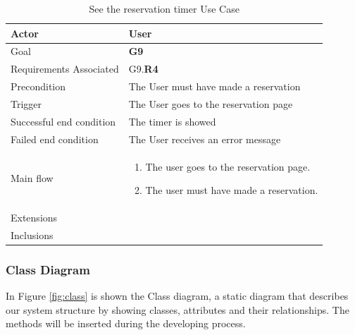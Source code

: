\newline
\begin{table}[htb]
\begin{center}
\renewcommand{\arraystretch}{1.5}
\begin{tabular}{|l|p{}|}
\hline
Actor & User \\ \hline
Goal & \textbf{G9} \\ \hline
Requirements Associated & G9.\textbf{R4} \\ \hline
Precondition & The User must have made a reservation \\ \hline
Trigger & The User goes to the reservation page \\ \hline
Successful end condition & The timer is showed \\ \hline
Failed end condition & The User receives an error message \\ \hline
Main flow & \begin{minipage}[t]{0.6\textwidth}
\begin{enumerate}
\addtolength{\itemindent}{0.5cm}
\item The user goes to the reservation page.
\item The user must have made a reservation. 
\vspace{2,5mm}
\end{enumerate}
\end{minipage} \\ \hline
Extensions & \\ \hline
Inclusions & \\ \hline
\end{tabular}
\caption{ See the reservation timer Use Case}
\end{center}
\end{table}
\clearpage

\subsubsection{Class Diagram}
In Figure \ref{fig:class} is shown the Class diagram, a static diagram that describes our system structure by showing classes, attributes and their relationships. The methods will be inserted during the developing process.


